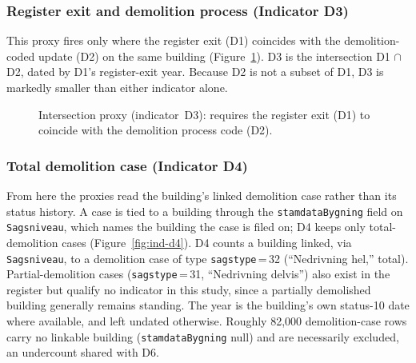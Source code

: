\subsubsection*{Register exit and demolition process (Indicator D3)}

This proxy fires only where the register exit (D1) coincides with the
demolition-coded update (D2) on the same building
(Figure~\ref{fig:ind-d3}). D3 is the intersection D1 $\cap$ D2, dated by
D1's register-exit year. Because D2 is not a subset of D1, D3 is markedly
smaller than either indicator alone.

\begin{figure}[h!]
\centering
{}
\caption{Intersection proxy (indicator~D3): requires the register exit
(D1) to coincide with the demolition process code (D2).}
\label{fig:ind-d3}
\end{figure}

\subsubsection*{Total demolition case (Indicator D4)}

From here the proxies read the building's linked demolition case rather
than its status history. A case is tied to a building through the
\texttt{stamdataBygning} field on \texttt{Sagsniveau}, which names the
building the case is filed on; D4 keeps only total-demolition cases
(Figure~\ref{fig:ind-d4}). D4 counts a building linked, via
\texttt{Sagsniveau}, to a demolition case of type
\texttt{sagstype}\,=\,32 (``Nedrivning hel,'' total). Partial-demolition
cases (\texttt{sagstype}\,=\,31, ``Nedrivning delvis'') also exist in the
register but qualify no indicator in this study, since a partially
demolished building generally remains standing. The year is the
building's own status-10 date where available, and left undated
otherwise. Roughly 82{,}000 demolition-case rows carry no linkable
building (\texttt{stamdataBygning} null) and are necessarily excluded, an
undercount shared with D6.

